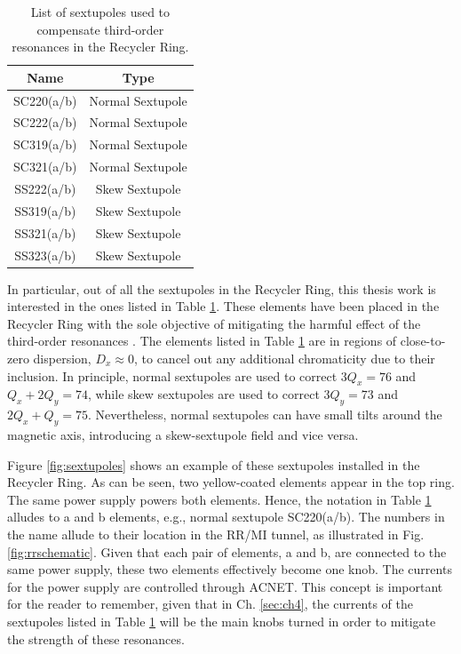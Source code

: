 \begin{table}[H]
   \centering
   \caption{List of sextupoles used to compensate third-order resonances in the Recycler Ring.}
   \label{tab:sextscomp}
   \begin{tabular}{|c|c|}
   \hline
   \textbf{Name} & \textbf{Type}    \\ \hline
   SC220(a/b)    & Normal Sextupole \\ \hline
   SC222(a/b)    & Normal Sextupole \\ \hline
   SC319(a/b)    & Normal Sextupole \\ \hline
   SC321(a/b)    & Normal Sextupole \\ \hline
   SS222(a/b)    & Skew Sextupole   \\ \hline
   SS319(a/b)    & Skew Sextupole   \\ \hline
   SS321(a/b)    & Skew Sextupole   \\ \hline
   SS323(a/b)    & Skew Sextupole   \\ \hline
   \end{tabular}
   \end{table}

In particular, out of all the sextupoles in the Recycler Ring, this thesis work is interested in the ones listed in Table \ref{tab:sextscomp}. These elements have been placed in the Recycler Ring with the sole objective of mitigating the harmful effect of the third-order resonances \cite{rr2}. The elements listed in Table \ref{tab:sextscomp} are in regions of close-to-zero dispersion, $D_x \approx 0$, to cancel out any additional chromaticity due to their inclusion. In principle, normal sextupoles are used to correct $3Q_x=76$ and $Q_x+2Q_y=74$, while skew sextupoles are used to correct $3Q_y=73$ and $2Q_x+Q_y=75$. Nevertheless, normal sextupoles can have small tilts around the magnetic axis, introducing a skew-sextupole field and vice versa.

Figure \ref{fig:sextupoles} shows an example of these sextupoles installed in the Recycler Ring. As can be seen, two yellow-coated elements appear in the top ring. The same power supply powers both elements. Hence, the notation in Table \ref{tab:sextscomp} alludes to a and b elements, e.g., normal sextupole SC220(a/b). The numbers in the name allude to their location in the RR/MI tunnel, as illustrated in Fig. \ref{fig:rrschematic}. Given that each pair of elements, a and b, are connected to the same power supply, these two elements effectively become one knob. The currents for the power supply are controlled through ACNET. This concept is important for the reader to remember, given that in Ch. \ref{sec:ch4}, the currents of the sextupoles listed in Table \ref{tab:sextscomp} will be the main knobs turned in order to mitigate the strength of these resonances.    

